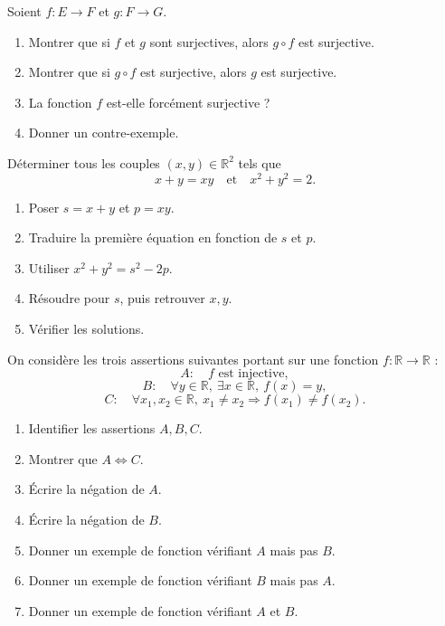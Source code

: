 \documentclass[11pt,a4paper]{article}
\newcommand{\R}{\mathbb{R}}
\newcommand{\imp}{\Rightarrow}
\newcommand{\ssi}{\Longleftrightarrow}
\begin{document}
\begin{exercicebox}
Soient \(f:E\to F\) et \(g:F\to G\).

\begin{enumerate}[label=\alph*)]
    \item Montrer que si \(f\) et \(g\) sont surjectives, alors \(g\circ f\) est surjective.
    \item Montrer que si \(g\circ f\) est surjective, alors \(g\) est surjective.
    \item La fonction \(f\) est-elle forcément surjective ?
    \item Donner un contre-exemple.
\end{enumerate}
\end{exercicebox}

\begin{exercicebox}
Déterminer tous les couples \((x,y)\in\R^2\) tels que
\[
x+y=xy
\quad\text{et}\quad
x^2+y^2=2.
\]

\begin{enumerate}[label=\alph*)]
    \item Poser \(s=x+y\) et \(p=xy\).
    \item Traduire la première équation en fonction de \(s\) et \(p\).
    \item Utiliser \(x^2+y^2=s^2-2p\).
    \item Résoudre pour \(s\), puis retrouver \(x,y\).
    \item Vérifier les solutions.
\end{enumerate}
\end{exercicebox}

\begin{exercicebox}
On considère les trois assertions suivantes portant sur une fonction \(f:\R\to\R\) :
\[
A:\quad f \text{ est injective},
\]
\[
B:\quad \forall y\in\R,\ \exists x\in\R,\ f(x)=y,
\]
\[
C:\quad \forall x_1,x_2\in\R,\ x_1\neq x_2\imp f(x_1)\neq f(x_2).
\]

\begin{enumerate}[label=\alph*)]
    \item Identifier les assertions \(A,B,C\).
    \item Montrer que \(A\ssi C\).
    \item Écrire la négation de \(A\).
    \item Écrire la négation de \(B\).
    \item Donner un exemple de fonction vérifiant \(A\) mais pas \(B\).
    \item Donner un exemple de fonction vérifiant \(B\) mais pas \(A\).
    \item Donner un exemple de fonction vérifiant \(A\) et \(B\).
\end{enumerate}
\end{exercicebox}
\end{document}
